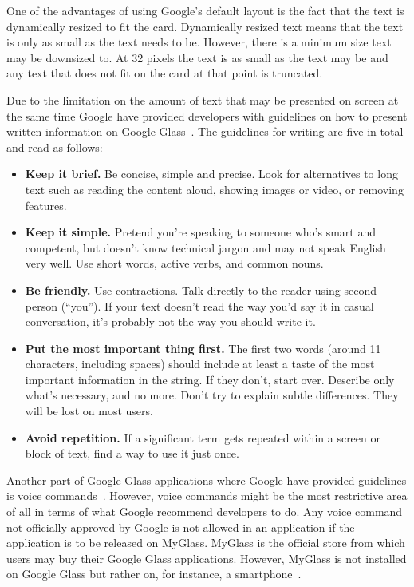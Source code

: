 One of the advantages of using Google's default layout is the fact that the text is dynamically resized to fit the card. Dynamically resized text means that the text is only as small as the text needs to be. However, there is a minimum size text may be downsized to. At 32 pixels the text is as small as the text may be and any text that does not fit on the card at that point is truncated.

Due to the limitation on the amount of text that may be presented on screen at the same time Google have provided developers with guidelines on how to present written information on Google Glass~\cite{glassDesignStyle}. The guidelines for writing are five in total and read as follows:

\begin{itemize}
	\item \textbf{Keep it brief.} Be concise, simple and precise. Look for alternatives to long text such as reading the content aloud, showing images or video, or removing features.
	\item \textbf{Keep it simple.} Pretend you're speaking to someone who's smart and competent, but doesn't know technical jargon and may not speak English very well. Use short words, active verbs, and common nouns.
	\item \textbf{Be friendly.} Use contractions. Talk directly to the reader using second person (``you''). If your text doesn't read the way you'd say it in casual conversation, it's probably not the way you should write it.
	\item \textbf{Put the most important thing first.} The first two words (around 11 characters, including spaces) should include at least a taste of the most important information in the string. If they don't, start over. Describe only what's necessary, and no more. Don't try to explain subtle differences. They will be lost on most users.
	\item \textbf{Avoid repetition.} If a significant term gets repeated within a screen or block of text, find a way to use it just once.
\end{itemize}

Another part of Google Glass applications where Google have provided guidelines is voice commands~\cite{googleGlassVoiceCommand}. However, voice commands might be the most restrictive area of all in terms of what Google recommend developers to do. Any voice command not officially approved by Google is not allowed in an application if the application is to be released on MyGlass. MyGlass is the official store from which users may buy their Google Glass applications. However, MyGlass is not installed on Google Glass but rather on, for instance, a smartphone~\cite{myGlass}.

